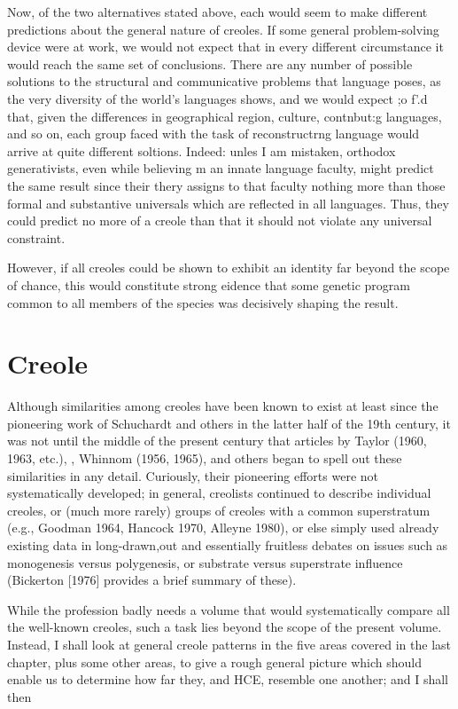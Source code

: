 Now, of the two alternatives stated above, each would seem to make different predictions about the general nature of creoles. If some general problem-solving device were at work, we would not expect that in every different circumstance it would reach the same set of conclusions. There are any number of possible solutions to the struc\-tural and communicative problems that language poses, as the very diversity of the world's languages shows, and we would expect ;o f'.{\textquotedbl}d that, given the differences in geographical region, culture, contnbut:{\textquotedbl}g languages, and so on, each group faced with the task of reconstructrng language would arrive at quite different soltions. Indeed: unles I am mistaken, orthodox generativists, even while believing m an innate language faculty, might predict the same result since their thery assigns to that faculty nothing more than those formal and substantive universals which are reflected in all languages. Thus, they could pre\-dict no more of a creole than that it should not violate any universal constraint.

However, if all creoles could be shown to exhibit an identity far beyond the scope of chance, this would constitute strong eidence that some genetic program common to all members of the species was decisively shaping the result.

\chapter{Creole}

Although similarities among creoles have been known to exist at least since the pioneering work of Schuchardt and others in the latter half of the 19th century, it was not until the middle of the present century that articles by Taylor (1960, 1963, etc.), \citet{Thompson1961}, Whinnom (1956, 1965), and others began to spell out these similarities in any detail. Curiously, their pioneering efforts were not systematically developed; in general, creolists continued to describe individual creoles, or (much more rarely) groups of creoles with a common superstratum (e.g., Goodman 1964, Hancock 1970, Alleyne 1980), or else simply used already existing data in long-drawn,out and essentially fruitless debates on issues such as monogenesis versus poly\-genesis, or substrate versus superstrate influence (Bickerton [1976] provides a brief summary of these).

While the profession badly needs a volume that would systema\-tically compare all the well-known creoles, such a task lies beyond the scope of the present volume. Instead, I shall look at general creole patterns in the five areas covered in the last chapter, plus some other areas, to give a rough general picture which should enable us to deter\-mine how far they, and HCE, resemble one another; and I shall then

